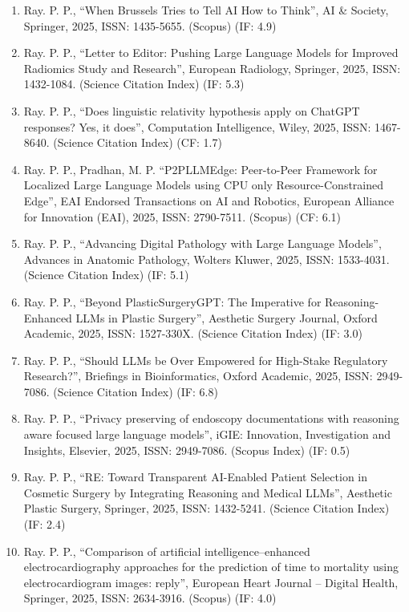 \documentclass[11pt,a4paper]{moderncv}
\begin{document}
\begin{adjustwidth}{6em}{0pt}
	\begin{enumerate}
		\item Ray. P. P., “When Brussels Tries to Tell AI How to Think”, AI \& Society, Springer, 2025, ISSN: 1435-5655. (Scopus) (IF: 4.9)
		\item Ray. P. P., “Letter to Editor: Pushing Large Language Models for Improved Radiomics Study and Research”, European Radiology, Springer, 2025, ISSN: 1432-1084. (Science Citation Index) (IF: 5.3)
		\item Ray. P. P., “Does linguistic relativity hypothesis apply on ChatGPT responses? Yes, it does”, Computation Intelligence, Wiley, 2025, ISSN: 1467-8640. (Science Citation Index) (CF: 1.7)
		\item Ray. P. P., Pradhan, M. P. “P2PLLMEdge: Peer-to-Peer Framework for Localized Large Language Models using CPU only Resource-Constrained Edge”, EAI Endorsed Transactions on AI and Robotics, European Alliance for Innovation (EAI), 2025, ISSN: 2790-7511. (Scopus) (CF: 6.1)
		\item Ray. P. P., “Advancing Digital Pathology with Large Language Models”, Advances in Anatomic Pathology, Wolters Kluwer, 2025, ISSN: 1533-4031. (Science Citation Index) (IF: 5.1)
		\item Ray. P. P., “Beyond PlasticSurgeryGPT: The Imperative for Reasoning-Enhanced LLMs in Plastic Surgery”, Aesthetic Surgery Journal, Oxford Academic, 2025, ISSN: 1527-330X. (Science Citation Index) (IF: 3.0)
		\item Ray. P. P., “Should LLMs be Over Empowered for High-Stake Regulatory Research?”, Briefings in Bioinformatics, Oxford Academic, 2025, ISSN: 2949-7086. (Science Citation Index) (IF: 6.8)
		\item Ray. P. P., “Privacy preserving of endoscopy documentations with reasoning aware focused large language models”, iGIE: Innovation, Investigation and Insights, Elsevier, 2025, ISSN: 2949-7086. (Scopus Index) (IF: 0.5)
		\item Ray. P. P., “RE: Toward Transparent AI-Enabled Patient Selection in Cosmetic Surgery by Integrating Reasoning and Medical LLMs”, Aesthetic Plastic Surgery, Springer, 2025, ISSN: 1432-5241. (Science Citation Index) (IF: 2.4)
		\item Ray. P. P., “Comparison of artificial intelligence–enhanced electrocardiography approaches for the prediction of time to mortality using electrocardiogram images: reply”, European Heart Journal – Digital Health, Springer, 2025, ISSN: 2634-3916. (Scopus) (IF: 4.0)

\end{enumerate}
\end{adjustwidth}
\end{document}
